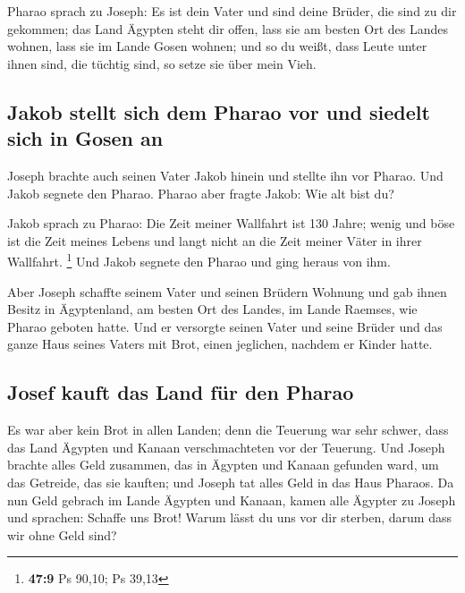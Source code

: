  Pharao sprach zu Joseph: Es ist dein Vater und sind deine
Brüder, die sind zu dir gekommen;  das Land Ägypten steht
dir offen, lass sie am besten Ort des Landes wohnen, lass sie im Lande
Gosen wohnen; und so du weißt, dass Leute unter ihnen sind, die tüchtig
sind, so setze sie über mein Vieh.

\hypertarget{jakob-stellt-sich-dem-pharao-vor-und-siedelt-sich-in-gosen-an}{%
\subsection{Jakob stellt sich dem Pharao vor und siedelt sich in Gosen
an}\label{jakob-stellt-sich-dem-pharao-vor-und-siedelt-sich-in-gosen-an}}

 Joseph brachte auch seinen Vater Jakob hinein und stellte
ihn vor Pharao. Und Jakob segnete den Pharao.  Pharao aber
fragte Jakob: Wie alt bist du?

 Jakob sprach zu Pharao: Die Zeit meiner Wallfahrt ist 130
Jahre; wenig und böse ist die Zeit meines Lebens und langt nicht an die
Zeit meiner Väter in ihrer Wallfahrt. \footnote{\textbf{47:9} Ps 90,10;
  Ps 39,13}  Und Jakob segnete den Pharao und ging heraus
von ihm.

 Aber Joseph schaffte seinem Vater und seinen Brüdern
Wohnung und gab ihnen Besitz in Ägyptenland, am besten Ort des Landes,
im Lande Raemses, wie Pharao geboten hatte.  Und er
versorgte seinen Vater und seine Brüder und das ganze Haus seines Vaters
mit Brot, einen jeglichen, nachdem er Kinder hatte.

\hypertarget{josef-kauft-das-land-fuxfcr-den-pharao}{%
\subsection{Josef kauft das Land für den
Pharao}\label{josef-kauft-das-land-fuxfcr-den-pharao}}

 Es war aber kein Brot in allen Landen; denn die Teuerung
war sehr schwer, dass das Land Ägypten und Kanaan verschmachteten vor
der Teuerung.  Und Joseph brachte alles Geld zusammen,
das in Ägypten und Kanaan gefunden ward, um das Getreide, das sie
kauften; und Joseph tat alles Geld in das Haus Pharaos. 
Da nun Geld gebrach im Lande Ägypten und Kanaan, kamen alle Ägypter zu
Joseph und sprachen: Schaffe uns Brot! Warum lässt du uns vor dir
sterben, darum dass wir ohne Geld sind?

